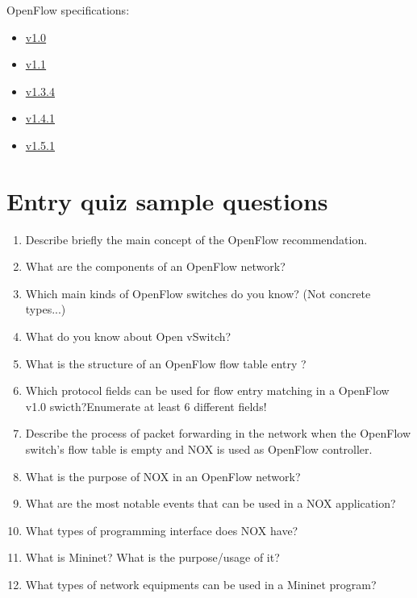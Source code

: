\documentclass{article}
\begin{document}
OpenFlow specifications:
\begin{itemize}
    \item
          \href{https://qosip.tmit.bme.hu/foswiki/pub/Meres/OpenFlowMScMeresiSegedlet/openflow-spec-v1.0.0.pdf}{v1.0}
    \item
          \href{https://qosip.tmit.bme.hu/foswiki/pub/Meres/OpenFlowMScMeresiSegedlet/openflow-spec-v1.1.0.pdf}{v1.1}
    \item

          \href{https://qosip.tmit.bme.hu/foswiki/pub/Meres/OpenFlowMScMeresiSegedlet/openflow-switch-v1.3.4.pdf}{v1.3.4}
    \item

          \href{https://qosip.tmit.bme.hu/foswiki/pub/Meres/OpenFlowMScMeresiSegedlet/openflow-switch-v1.4.1.pdf}{v1.4.1}
    \item

          \href{https://qosip.tmit.bme.hu/foswiki/pub/Meres/OpenFlowMScMeresiSegedlet/openflow-switch-v1.5.1.pdf}{v1.5.1}

\end{itemize}

\appendix

\section{Entry quiz sample questions}

\begin{enumerate}
    \item Describe briefly the main concept of the OpenFlow recommendation.
    \item What are the components of an OpenFlow network?
    \item Which main kinds of OpenFlow switches do you know? (Not concrete types...)
    \item What do you know about Open vSwitch?
    \item What is the structure of an OpenFlow flow table entry ?
    \item Which protocol fields can be used for flow entry matching in a OpenFlow v1.0 swicth?Enumerate at least 6
          different fields!
    \item Describe the process of packet forwarding in the network when the OpenFlow switch's flow table is empty and
          NOX is used as OpenFlow controller.
    \item What is the purpose of NOX in an OpenFlow network?
    \item What are the most notable events that can be used in a NOX application?
    \item What types of programming interface does NOX have?
    \item What is Mininet? What is the purpose/usage of it?
    \item What types of network equipments can be used in a Mininet program?
\end{enumerate}
\end{document}
